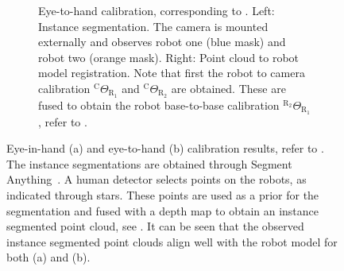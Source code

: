 \begin{figure}
\begin{subfigure}[b]{\textwidth}
         \caption{Eye-to-hand calibration, corresponding to . Left: Instance segmentation. The camera is mounted externally and observes robot one (blue mask) and robot two (orange mask). Right: Point cloud to robot model registration. Note that first the robot to camera calibration $^\text{C}\Theta_{\text{R}_1}$ and $^\text{C}\Theta_{\text{R}_2}$ are obtained. These are fused to obtain the robot base-to-base calibration $^{\text{R}_2}\Theta_{\text{R}_1}$, refer to .}
         \label{c1:fig:double_registration}
     \end{subfigure}
     \caption{Eye-in-hand (a) and eye-to-hand (b) calibration results, refer to . The instance segmentations are obtained through Segment Anything~\citep{segment_anything}. A human detector selects points on the robots, as indicated through stars. These points are used as a prior for the segmentation and fused with a depth map to obtain an instance segmented point cloud, see . It can be seen that the observed instance segmented point clouds align well with the robot model for both (a) and (b).}
     \label{c1:fig:registration_results}
\end{figure}

